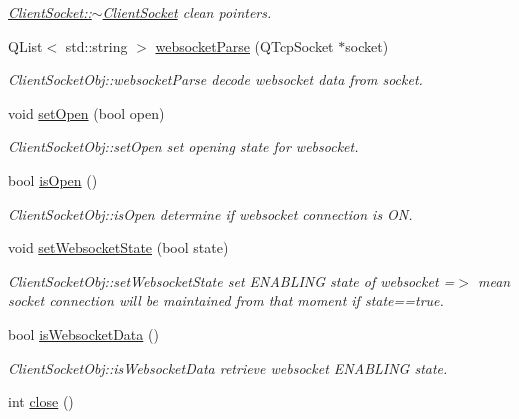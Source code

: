 \begin{DoxyCompactItemize}
\begin{DoxyCompactList}\small\item\em \hyperlink{class_client_socket_aef5d9c1c9b443124b820521276b175ca}{Client\-Socket\-::$\sim$\-Client\-Socket} clean pointers. \end{DoxyCompactList}\item 
Q\-List$<$ std\-::string $>$ \hyperlink{class_client_socket_a1946057d900be8de8c6f66cedf0a607a}{websocket\-Parse} (Q\-Tcp\-Socket $\ast$socket)
\begin{DoxyCompactList}\small\item\em Client\-Socket\-Obj\-::websocket\-Parse decode websocket data from socket. \end{DoxyCompactList}\item 
void \hyperlink{class_client_socket_a5ec144ce9f5b71f11d861a5f94273bf2}{set\-Open} (bool open)
\begin{DoxyCompactList}\small\item\em Client\-Socket\-Obj\-::set\-Open set opening state for websocket. \end{DoxyCompactList}\item 
bool \hyperlink{class_client_socket_ab3747426831f271a9a0e54c5b44bddc7}{is\-Open} ()
\begin{DoxyCompactList}\small\item\em Client\-Socket\-Obj\-::is\-Open determine if websocket connection is O\-N. \end{DoxyCompactList}\item 
void \hyperlink{class_client_socket_a985fe4b2ab2ae12e4dbbd165580698ac}{set\-Websocket\-State} (bool state)
\begin{DoxyCompactList}\small\item\em Client\-Socket\-Obj\-::set\-Websocket\-State set E\-N\-A\-B\-L\-I\-N\-G state of websocket =$>$ mean socket connection will be maintained from that moment if state==true. \end{DoxyCompactList}\item 
bool \hyperlink{class_client_socket_a3ddc70db4798e5c8455a0ceecb470c70}{is\-Websocket\-Data} ()
\begin{DoxyCompactList}\small\item\em Client\-Socket\-Obj\-::is\-Websocket\-Data retrieve websocket E\-N\-A\-B\-L\-I\-N\-G state. \end{DoxyCompactList}\item 
int \hyperlink{class_client_socket_aedce28b93f08367feb6c43b808bb63e5}{close} ()
\item 

\end{DoxyCompactItemize}

